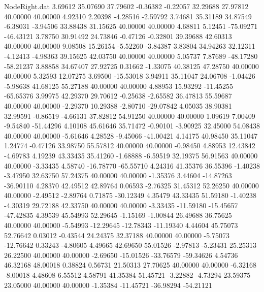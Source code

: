 \begin{filecontents}{NodeRight.dat}
   3.69612   35.07690   37.79602    -0.36382   -0.22057   32.29688   27.97812   40.00000   40.00000    4.92310    2.20398   -4.28516   -2.59792
   3.74681   35.31189   34.87549    -6.38031   -3.94506   33.88438   31.15625   40.00000   40.00000    4.68811    5.12451  -75.09271  -46.43121
   3.78750   30.91492   24.73846    -0.47126   -0.32801   39.39688   42.60313   40.00000   40.00000    9.08508   15.26154   -5.52260   -3.84387
   3.83804   34.94263   32.12311    -4.12413   -4.98363   39.15625   42.03750   40.00000   40.00000    5.05737    7.87689  -48.17280  -58.21237
   3.88858   34.67407   27.92725     0.31662   -1.33075   40.38125   47.28750   40.00000   40.00000    5.32593   12.07275    3.69500  -15.53018
   3.94911   35.11047   24.06708    -1.04426   -5.98638   41.68125   55.27188   40.00000   40.00000    4.88953   15.93292  -11.45255  -65.65376
   3.99975   42.29370   29.70612    -0.25638   -2.65582   36.47813   55.59687   40.00000   40.00000   -2.29370   10.29388   -2.80710  -29.07842
   4.05035   38.90381   32.99591    -0.86519   -4.66131   37.82812   54.91250   40.00000   40.00000    1.09619    7.00409   -9.54840  -51.44296
   4.10108   45.61646   35.71472    -0.90101   -3.90925   32.45000   54.08438   40.00000   40.00000   -5.61646    4.28528   -9.45066  -41.00421
   4.14175   40.98450   35.11047     1.24774   -0.47126   33.98750   55.57812   40.00000   40.00000   -0.98450    4.88953   12.43842   -4.69783
   4.19239   43.33435   35.41260    -1.68888   -6.59519   32.19375   56.91563   40.00000   40.00000   -3.33435    4.58740  -16.78770  -65.55710
   4.24316   41.35376   36.55396    -1.40238   -3.47950   32.63750   57.24375   40.00000   40.00000   -1.35376    3.44604  -14.87263  -36.90110
   4.28370   42.49512   42.89764     0.06593   -2.76325   31.45312   52.26250   40.00000   40.00000   -2.49512   -2.89764    0.71875  -30.12349
   4.35479   43.33435   51.59180    -1.40238   -4.30319   29.72188   42.33750   40.00000   40.00000   -3.33435  -11.59180  -15.45657  -47.42835
   4.39539   45.54993   52.29645    -1.15169   -1.00844   26.49688   36.75625   40.00000   40.00000   -5.54993  -12.29645  -12.78343  -11.19340
   4.44604   45.75073   52.76642     0.03012   -0.43544   24.24375   32.37188   40.00000   40.00000   -5.75073  -12.76642    0.33243   -4.80605
   4.49665   42.69650   55.01526    -2.97813   -5.23431   25.25313   26.22500   40.00000   40.00000   -2.69650  -15.01526  -33.76579  -59.34626
   4.54736   46.32168   48.00018     0.38824    0.56731   21.50313   27.70625   40.00000   40.00000   -6.32168   -8.00018    4.48608    6.55512
   4.58791   41.35384   51.45721    -3.22882   -4.73294   23.59375   23.05000   40.00000   40.00000   -1.35384  -11.45721  -36.98294  -54.21121

\end{filecontents}
